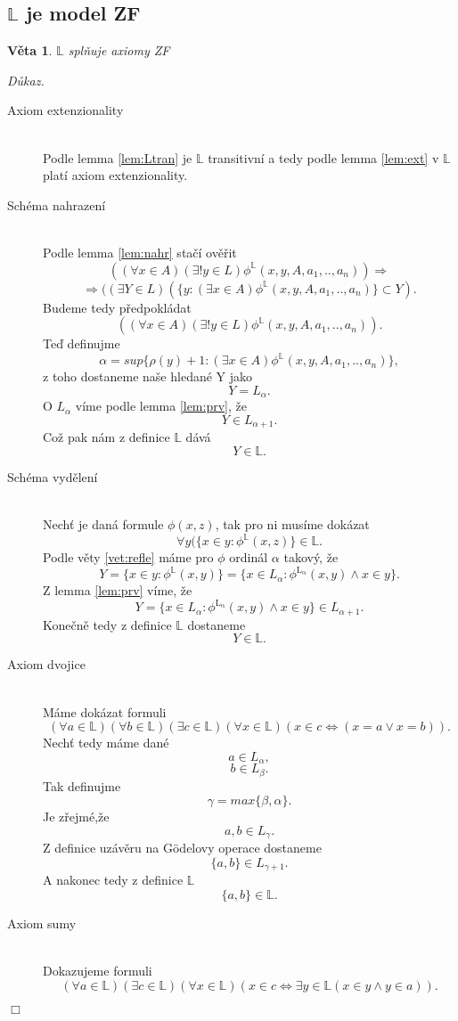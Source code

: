 \documentclass[12pt,a4paper]{article}
\newtheorem{veta}{V\v{e}ta}[section]%
\newenvironment{proof}
{\noindent \textit{D\r{u}kaz.}}
{\hspace*{\fill} $\Box$}
\begin{document}
\subsection{$ \mathbb{L} $ je model ZF} 
\begin{veta}
\label{vet:ZF}
$ \mathbb{L} $ spl\v{n}uje axiomy ZF 
\end{veta}
\begin{proof}~
\begin{description}
  \item[Axiom extenzionality] ~\\
  Podle lemma \ref{lem:Ltran} je $ \mathbb{L} $ transitivn\'{i} a tedy podle lemma \ref{lem:ext} v $ \mathbb{L} $ plat\'{i} axiom extenzionality.
  \item[Sch\'{e}ma nahrazen\'{i}] ~\\
  Podle lemma \ref{lem:nahr} sta\v{c}\'{i} ov\v{e}\v{r}it 
\[ ((\forall x\in A) (\exists!y\in L) \phi^\mathbb{L}(x,y,A,a_1,..,a_n)) \Rightarrow \]\[ \Rightarrow((\exists Y \in L)(\{y:(\exists x \in A)  \phi^\mathbb{L}(x,y,A,a_1,..,a_n) \} \subset Y) .\]
Budeme tedy p\v{r}edpokl\'{a}dat 
\[ ((\forall x\in A) (\exists!y\in L) \phi^\mathbb{L}(x,y,A,a_1,..,a_n))  .\]
Te\v{d} definujme 
\[ \alpha=sup\{\rho(y) +1 : (\exists x \in A)  \phi^\mathbb{L}(x,y,A,a_1,..,a_n) \} , \]
z toho dostaneme na\v{s}e hledan\'{e} Y jako \[ Y=L_\alpha .\] O $ L_\alpha  $ v\'{i}me podle lemma \ref{lem:prv}, \v{z}e  \[ Y \in L_{\alpha + 1} .\]
Co\v{z} pak n\'{a}m z definice $ \mathbb{L}$ d\'{a}v\'{a}
\[  Y \in \mathbb{L} .\]
\item[Sch\'{e}ma vyd\v{e}len\'{i}]~\\
Nech\v{t} je dan\'{a} formule $ \phi(x,z) $, tak pro ni mus\'{i}me dok\'{a}zat 
\[ \forall y(\{x \in y :\phi^\mathbb{L}(x,z) \} \in \mathbb{L} .\]
Podle v\v{e}ty \ref{vet:refle} m\'{a}me pro $ \phi $ ordin\'{a}l $ \alpha  $ takov\'{y}, \v{z}e  
\[ Y=\{x \in y :\phi^\mathbb{L}(x,y) \}=\{x \in L_\alpha :\phi^\mathrm{L_\alpha}(x,y) \wedge x \in y\} .\]
Z lemma \ref{lem:prv} v\'{i}me, \v{z}e
\[ Y=\{x \in L_\alpha :\phi^\mathrm{L_\alpha}(x,y) \wedge x \in y\} \in L_{\alpha+1} .\]
Kone\v{c}n\v{e} tedy  z definice $ \mathbb{L}$  dostaneme
\[  Y \in \mathbb{L} .\]
\item[Axiom dvojice]~\\
M\'{a}me dok\'{a}zat formuli
\[ (\forall a \in \mathbb{L})(\forall b \in \mathbb{L})(\exists c \in \mathbb{L})(\forall x \in \mathbb{L})(x \in c \Leftrightarrow(x=a \vee x=b)) .\]
Nech\v{t} tedy m\'{a}me dan\'{e}  \[ a \in L_\alpha, \]  \[  b \in L_\beta  .\] 
Tak definujme  \[ \gamma=max\{\beta,\alpha\} .\] Je z\v{r}ejm\'{e},\v{z}e \[ a,b \in L_\gamma .\]  
Z definice uz\'{a}v\v{e}ru na G\"{o}delovy operace dostaneme \[ \{a,b\} \in L_{\gamma+1} .\] A nakonec tedy z definice $ \mathbb{L} $
\[  \{a,b\} \in \mathbb{L} .\]
\item[Axiom sumy]~\\
Dokazujeme formuli
\[ (\forall a \in \mathbb{L})(\exists c \in \mathbb{L})(\forall x \in \mathbb{L})(x \in c \Leftrightarrow \exists y \in \mathbb{L}(x \in y  \wedge y \in a)) .\]


\end{description}
\end{proof}
\end{document}
